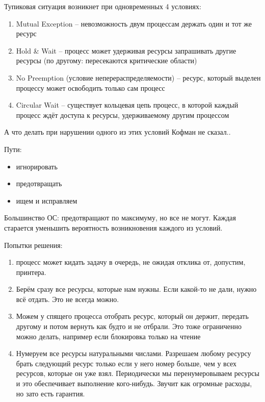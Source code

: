 \documentclass{book}
\theoremstyle{definition}
\begin{document}
\begin{theorem}
    [Кофман]

    Тупиковая ситуация возникнет при одновременных 4 условиях:
    \begin{enumerate}
        \item Mutual Exception -- невозможность двум процессам держать один и тот же ресурс
        \item Hold \& Wait -- процесс может удерживая ресурсы запрашивать другие ресурсы (по другому: пересекаются критические области)
        \item No Preemption (условие неперераспределяемости) -- ресурс, который выделен процессу может освободить только сам процесс
        \item Circular Wait -- существует кольцевая цепь процесс, в которой каждый процесс ждёт доступа к ресурсы, удерживаемому другим процессом
    \end{enumerate}

    А что делать при нарушении одного из этих условий Кофман не сказал..
\end{theorem}

Пути:
\begin{itemize}
    \item игнорировать
    \item предотвращать
    \item ищем и исправляем
\end{itemize}

Большинство ОС: предотвращают по максимуму, но все не могут. Каждая старается уменьшить вероятность возникновения каждого из условий.

Попытки решения:
\begin{enumerate}
    \item процесс может кидать задачу в очередь, не ожидая отклика от, допустим, принтера.
    \item Берём сразу все ресурсы, которые нам нужны. Если какой-то не дали, нужно всё отдать. Это не всегда можно.
    \item Можем у спящего процесса отобрать ресурс, который он держит, передать другому и потом вернуть как будто и не отбрали. Это тоже ограниченно можно делать, например если блокировка только на чтение
    \item Нумеруем все ресурсы натуральными числами. Разрешаем любому ресурсу брать следующий ресурс только если у него номер больше, чем у всех ресурсов, которые он уже взял. Периодически мы перенумеровываем ресурсы и это обеспечивает выполнение кого-нибудь. Звучит как огромные расходы, но зато есть гарантия.
\end{enumerate}
\end{document}
